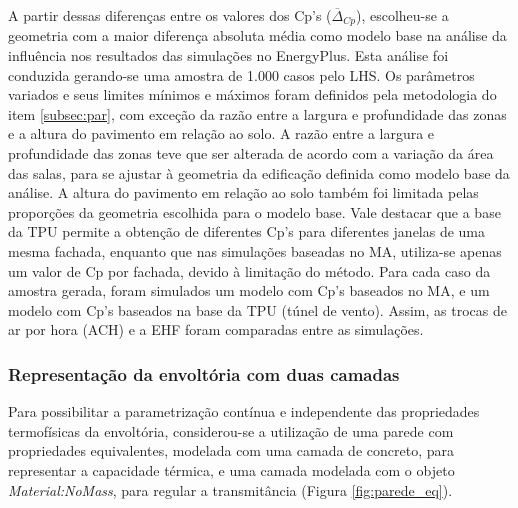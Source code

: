 \documentclass[brazil,hardcopy,openany,a5paper]{ufscthesis}
\begin{document}
		A partir dessas diferenças entre os valores dos Cp's ($\overline{\Delta}_{Cp}$), escolheu-se a geometria com a maior diferença absoluta média como modelo base na análise da influência nos resultados das simulações no EnergyPlus.
		Esta análise foi conduzida gerando-se uma amostra de 1.000 casos pelo LHS.
		Os parâmetros variados e seus limites mínimos e máximos foram definidos pela metodologia do item \ref{subsec:par}, com exceção da razão entre a largura e profundidade das zonas e a altura do pavimento em relação ao solo.
		A razão entre a largura e profundidade das zonas teve que ser alterada de acordo com a variação da área das salas, para se ajustar à geometria da edificação definida como modelo base da análise.
		A altura do pavimento em relação ao solo também foi limitada pelas proporções da geometria escolhida para o modelo base.
		Vale destacar que a base da TPU permite a obtenção de diferentes Cp's para diferentes janelas de uma mesma fachada, enquanto que nas simulações baseadas no MA, utiliza-se apenas um valor de Cp por fachada, devido à limitação do método. 
		Para cada caso da amostra gerada, foram simulados um modelo com Cp’s baseados no MA, e um modelo com Cp’s baseados na base da TPU (túnel de vento).
		Assim, as trocas de ar por hora (ACH) e a EHF foram comparadas entre as simulações.
				
%		
		
		\subsubsection{Representação da envoltória com duas camadas}
		
		Para possibilitar a parametrização contínua e independente das propriedades termofísicas da envoltória, considerou-se a utilização de uma parede com propriedades equivalentes, modelada com uma camada de concreto, para representar a capacidade térmica, e uma camada modelada com o objeto \textit{Material:NoMass}, para regular a transmitância (Figura \ref{fig:parede_eq}).
		
\end{document}
